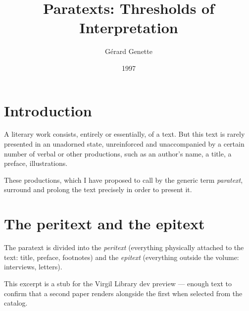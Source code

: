 \documentclass{article}
\title{Paratexts: Thresholds of Interpretation}
\author{G\'{e}rard Genette}
\date{1997}
\begin{document}
\maketitle

\section*{Introduction}

A literary work consists, entirely or essentially, of a text. But this
text is rarely presented in an unadorned state, unreinforced and
unaccompanied by a certain number of verbal or other productions, such as
an author's name, a title, a preface, illustrations.

These productions, which I have proposed to call by the
generic term \emph{paratext}, surround and prolong the text precisely in
order to present it.

\section{The peritext and the epitext}

The paratext is divided into the \emph{peritext} (everything physically
attached to the text: title, preface, footnotes) and the \emph{epitext}
(everything outside the volume: interviews, letters).

This excerpt is a stub for the Virgil Library dev preview ---
enough text to confirm that a second paper renders alongside the first
when selected from the catalog.
\end{document}
